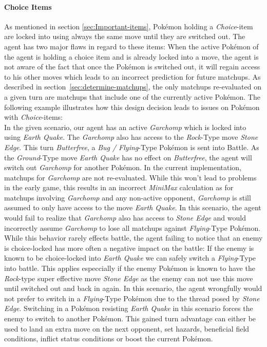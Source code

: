 \paragraph{Choice Items}
As mentioned in section \ref{sec:Important-items}, Pokémon holding a \textit{Choice}-item are locked into using always 
the same move until they are switched out. The agent has two major flaws in regard to these items: When the active
Pokémon of the agent is holding a choice item and is already locked into a move, the agent is not aware of the fact that
once the Pokémon is switched out, it will regain access to his other moves which leads to an incorrect prediction
for future matchups. As described in section~\ref{sec:determine-matchups}, the only matchups re-evaluated
on a given turn are matchups that include one of the currently active Pokémon. The following example illustrates how
this design decision leads to issues on Pokémon with \textit{Choice}-items: \\
In the given scenario, our agent has an active \textit{Garchomp} which is locked into using \textit{Earth Quake}. The 
\textit{Garchomp} also has access to the \textit{Rock}-Type move \textit{Stone Edge}. This turn \textit{Butterfree},
a \textit{Bug / Flying}-Type Pokémon
is sent into Battle. As the \textit{Ground}-Type move \textit{Earth Quake} has no effect on \textit{Butterfree}, the agent will
switch out \textit{Garchomp} for another Pokémon. In the current implementation, matchups for \textit{Garchomp} are not
re-evaluated. While this won't lead to problems in the early game, this results in an incorrect \textit{MiniMax} calculation
as for matchups involving \textit{Garchomp} and any non-active opponent, \textit{Garchomp} is still assumed to only have
access to the move \textit{Earth Quake}. In this scenario, the agent would fail to realize that \textit{Garchomp} also
has access to \textit{Stone Edge} and would incorrectly assume \textit{Garchomp} to lose all matchups against \textit{Flying}-Type
Pokémon. \\
While this behavior rarely effects battle, the agent failing to notice that an enemy is choice-locked has more often a 
negative impact on the battle: If the enemy is known to be choice-locked into \textit{Earth Quake} we can safely switch 
a \textit{Flying}-Type into battle. This applies especcially if the enemy Pokémon is known to have the \textit{Rock}-type 
super effective
move \textit{Stone Edge} as the enemy can not use this move until switched out and back in again. In this scenario, the
agent wrongfully would not prefer to switch in a \textit{Flying}-Type Pokémon due to the thread posed by 
\textit{Stone Edge}. Switching in a Pokémon resisting \textit{Earth Quake} in this scenario forces the enemy to switch
to another Pokémon. This gained turn advantage can either be used to land an extra move on the next opponent, set hazards,
beneficial field conditions, inflict status conditions or boost the current Pokémon.

